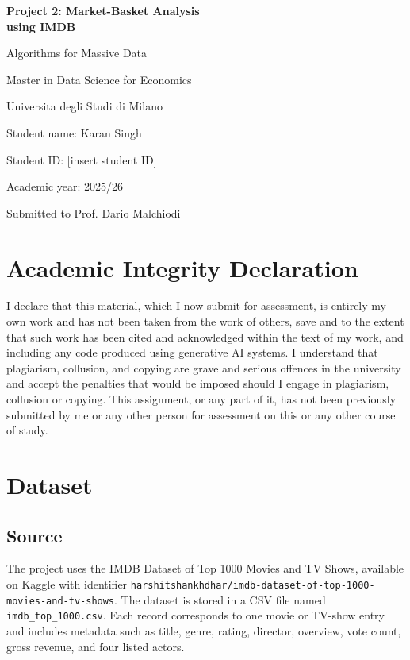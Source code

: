 \documentclass[11pt,a4paper]{article}
\begin{document}
\begin{titlepage}
    \centering
    \vspace*{2.5cm}
    {\Huge\bfseries Project 2: Market-Basket Analysis\\[0.2cm] using IMDB\par}
    \vspace{1.2cm}
    {\Large Algorithms for Massive Data\par}
    \vspace{0.4cm}
    {\large Master in Data Science for Economics\par}
    {\large Universita degli Studi di Milano\par}
    \vfill
    {\large Student name: Karan Singh\par}
    {\large Student ID: [insert student ID]\par}
    {\large Academic year: 2025/26\par}
    {\large Submitted to Prof. Dario Malchiodi\par}
    \vspace*{1cm}
\end{titlepage}

\newpage
\section*{Academic Integrity Declaration}
I declare that this material, which I now submit for assessment, is entirely my own work and has not been taken from the work of others, save and to the extent that such work has been cited and acknowledged within the text of my work, and including any code produced using generative AI systems. I understand that plagiarism, collusion, and copying are grave and serious offences in the university and accept the penalties that would be imposed should I engage in plagiarism, collusion or copying. This assignment, or any part of it, has not been previously submitted by me or any other person for assessment on this or any other course of study.

\newpage
\tableofcontents
\newpage

\section{Dataset}

\subsection{Source}
The project uses the IMDB Dataset of Top 1000 Movies and TV Shows, available on Kaggle with identifier \texttt{harshitshankhdhar/imdb-dataset-of-top-1000-movies-and-tv-shows}. The dataset is stored in a CSV file named \texttt{imdb\_top\_1000.csv}. Each record corresponds to one movie or TV-show entry and includes metadata such as title, genre, rating, director, overview, vote count, gross revenue, and four listed actors.
\end{document}
